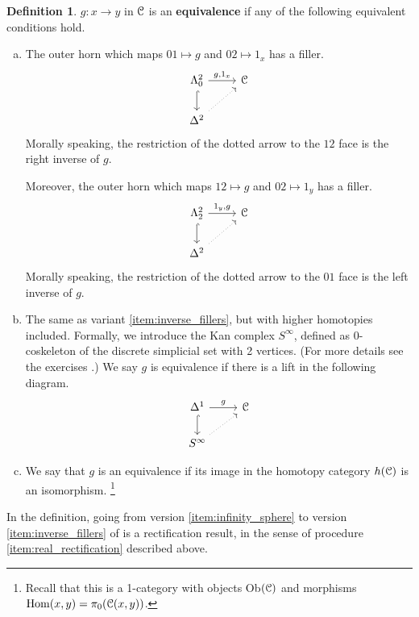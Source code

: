 \documentclass[10pt,a4paper,reqno,oneside]{book} %
\theoremstyle{plain}
\theoremstyle{definition}
\newtheorem{defin}[thm]{Definition}
\theoremstyle{remark}
\numberwithin{equation}{section}
\begin{document}
\begin{defin}
$g : x \to y$ in $\mathcal C$ is an \textbf{equivalence} if any of the following equivalent conditions hold.
\begin{enumerate}[(a)]
\item \label{item:inverse_fillers}
The outer horn which maps $01\mapsto g$ and $02 \mapsto 1_x$ has a filler.
\[
\begin{tikzcd}
\Lambda^2_0 \arrow{r}{g,1_x}\arrow[hook]{d} & \cC \\
\Delta^2 \arrow[dotted]{ur} & 
\end{tikzcd}
\]
Morally speaking, the restriction of the dotted arrow to the $12$ face is the right inverse of $g$.

Moreover, the outer horn which maps $12\mapsto g$ and $02 \mapsto 1_y$ has a filler.
\[
\begin{tikzcd}
\Lambda^2_2 \arrow{r}{1_y,g}\arrow[hook]{d} & \cC \\
\Delta^2 \arrow[dotted]{ur} & 
\end{tikzcd}
\]
Morally speaking, the restriction of the dotted arrow to the $01$ face is the left inverse of $g$.

\item \label{item:infinity_sphere}
The same as variant \ref{item:inverse_fillers}, but with higher homotopies included. Formally, we introduce the
Kan complex $S^{\infty}$, defined as 0-coskeleton of the discrete simplicial set with 2 vertices. (For more details see
the exercises \cite{Mauro_Exercises}.)
We say $g$ is equivalence if there is a lift in the following diagram.
\[
\begin{tikzcd}
\Delta^1 \arrow{r}{g}\arrow[hook]{d} & \cC \\
S^{\infty}\arrow[dotted]{ur} & 
\end{tikzcd}
\]

\item \label{item:iso_homcat}
We say that $g$ is an equivalence if its image in the homotopy category $h(\mathcal C)$ is an isomorphism.
\footnote{Recall that this is a 1-category with objects Ob$(\mathcal C)$ and morphisms $\operatorname{Hom}(x,y) = \pi_0(\mathcal C(x,y))$.}
\end{enumerate}
\end{defin}

In the definition, going from version \ref{item:infinity_sphere} to version \ref{item:inverse_fillers} of is a rectification result,
in the sense of procedure \ref{item:real_rectification} described above.
\end{document}
